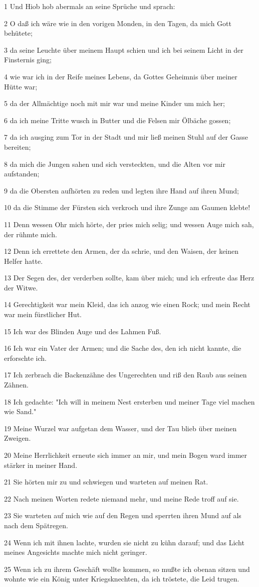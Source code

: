 \par 1 Und Hiob hob abermals an seine Sprüche und sprach:
\par 2 O daß ich wäre wie in den vorigen Monden, in den Tagen, da mich Gott behütete;
\par 3 da seine Leuchte über meinem Haupt schien und ich bei seinem Licht in der Finsternis ging;
\par 4 wie war ich in der Reife meines Lebens, da Gottes Geheimnis über meiner Hütte war;
\par 5 da der Allmächtige noch mit mir war und meine Kinder um mich her;
\par 6 da ich meine Tritte wusch in Butter und die Felsen mir Ölbäche gossen;
\par 7 da ich ausging zum Tor in der Stadt und mir ließ meinen Stuhl auf der Gasse bereiten;
\par 8 da mich die Jungen sahen und sich versteckten, und die Alten vor mir aufstanden;
\par 9 da die Obersten aufhörten zu reden und legten ihre Hand auf ihren Mund;
\par 10 da die Stimme der Fürsten sich verkroch und ihre Zunge am Gaumen klebte!
\par 11 Denn wessen Ohr mich hörte, der pries mich selig; und wessen Auge mich sah, der rühmte mich.
\par 12 Denn ich errettete den Armen, der da schrie, und den Waisen, der keinen Helfer hatte.
\par 13 Der Segen des, der verderben sollte, kam über mich; und ich erfreute das Herz der Witwe.
\par 14 Gerechtigkeit war mein Kleid, das ich anzog wie einen Rock; und mein Recht war mein fürstlicher Hut.
\par 15 Ich war des Blinden Auge und des Lahmen Fuß.
\par 16 Ich war ein Vater der Armen; und die Sache des, den ich nicht kannte, die erforschte ich.
\par 17 Ich zerbrach die Backenzähne des Ungerechten und riß den Raub aus seinen Zähnen.
\par 18 Ich gedachte: "Ich will in meinem Nest ersterben und meiner Tage viel machen wie Sand."
\par 19 Meine Wurzel war aufgetan dem Wasser, und der Tau blieb über meinen Zweigen.
\par 20 Meine Herrlichkeit erneute sich immer an mir, und mein Bogen ward immer stärker in meiner Hand.
\par 21 Sie hörten mir zu und schwiegen und warteten auf meinen Rat.
\par 22 Nach meinen Worten redete niemand mehr, und meine Rede troff auf sie.
\par 23 Sie warteten auf mich wie auf den Regen und sperrten ihren Mund auf als nach dem Spätregen.
\par 24 Wenn ich mit ihnen lachte, wurden sie nicht zu kühn darauf; und das Licht meines Angesichts machte mich nicht geringer.
\par 25 Wenn ich zu ihrem Geschäft wollte kommen, so mußte ich obenan sitzen und wohnte wie ein König unter Kriegsknechten, da ich tröstete, die Leid trugen.


